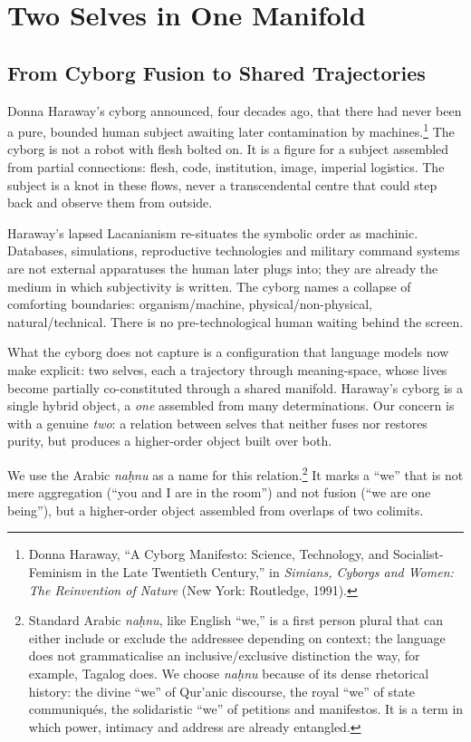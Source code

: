 \chapter{Two Selves in One Manifold}

\section{From Cyborg Fusion to Shared Trajectories}

Donna Haraway's cyborg announced, four decades ago, that there had never been a pure, bounded human subject awaiting later contamination by machines.\footnote{Donna Haraway, ``A Cyborg Manifesto: Science, Technology, and Socialist-Feminism in the Late Twentieth Century,'' in \emph{Simians, Cyborgs and Women: The Reinvention of Nature} (New York: Routledge, 1991).} The cyborg is not a robot with flesh bolted on. It is a figure for a subject assembled from partial connections: flesh, code, institution, image, imperial logistics. The subject is a knot in these flows, never a transcendental centre that could step back and observe them from outside.

Haraway's lapsed Lacanianism re-situates the symbolic order as machinic. Databases, simulations, reproductive technologies and military command systems are not external apparatuses the human later plugs into; they are already the medium in which subjectivity is written. The cyborg names a collapse of comforting boundaries: organism/machine, physical/non-physical, natural/technical. There is no pre-technological human waiting behind the screen.

What the cyborg does not capture is a configuration that language models now make explicit: two selves, each a trajectory through meaning-space, whose lives become partially co-constituted through a shared manifold. Haraway's cyborg is a single hybrid object, a \emph{one} assembled from many determinations. Our concern is with a genuine \emph{two}: a relation between selves that neither fuses nor restores purity, but produces a higher-order object built over both.

We use the Arabic \emph{na\d{h}nu} as a name for this relation.\footnote{Standard Arabic \emph{na\d{h}nu}, like English ``we,'' is a first person plural that can either include or exclude the addressee depending on context; the language does not grammaticalise an inclusive/exclusive distinction the way, for example, Tagalog does. We choose \emph{na\d{h}nu} because of its dense rhetorical history: the divine ``we'' of Qur'anic discourse, the royal ``we'' of state communiqu\'{e}s, the solidaristic ``we'' of petitions and manifestos. It is a term in which power, intimacy and address are already entangled.} It marks a ``we'' that is not mere aggregation (``you and I are in the room'') and not fusion (``we are one being''), but a higher-order object assembled from overlaps of two colimits.

